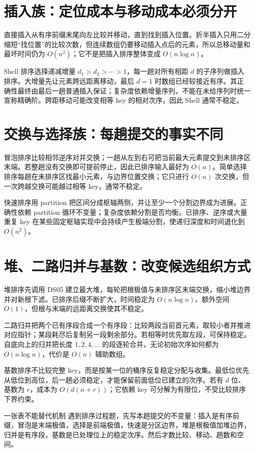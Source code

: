 \documentclass[UTF8,fontset=none,11pt,a4paper]{ctexart}
\begin{document}
\section{插入族：定位成本与移动成本必须分开}
直接插入从有序前缀末尾向左比较并移动，直到找到插入位置。折半插入只用二分缩短“找位置”的比较次数，但连续数组仍要移动插入点后的元素，所以总移动量和最坏时间仍为 $O(n^2)$；它不是把插入排序整体变成 $O(n\log n)$。

Shell 排序选择递减增量 $d_1>d_2>\cdots>1$，每一趟对所有相距 $d$ 的子序列做插入排序。大增量先让元素跨远距离移动，最后 $d=1$ 时数组已经较接近有序。其正确性最终由最后一趟普通插入保证；复杂度依赖增量序列，不能在未给序列时统一宣称精确阶。跨距移动可能改变相等 key 的相对次序，因此 Shell 通常不稳定。

\section{交换与选择族：每趟提交的事实不同}
冒泡排序比较相邻逆序对并交换；一趟从左到右可把当前最大元素提交到未排序区末端。若整趟没有交换即可提前停止，因此已排序输入最好为 $O(n)$。简单选择排序每趟在未排序区找最小元素，与边界位置交换；它只进行 $O(n)$ 次交换，但一次跨越交换可能越过相等 key，通常不稳定。

快速排序用 partition 把区间分成枢轴两侧，并让至少一个分割边界成为进展。正确性依赖 partition 循环不变量；复杂度依赖分割是否均衡。已排序、逆序或大量重复 key 在某些固定枢轴实现中会持续产生极端分割，使递归深度和时间退化到 $O(n^2)$。

\section{堆、二路归并与基数：改变候选组织方式}
堆排序先调用 DS05 建立最大堆，每轮把根极值与未排序区末端交换，缩小堆边界并对新根下滤。已排序后缀不断扩大，时间稳定为 $O(n\log n)$、额外空间 $O(1)$，但根与末端的远距离交换使其不稳定。

二路归并把两个已有序段合成一个有序段：比较两段当前首元素，取较小者并推进对应指针；某段耗尽后复制另一段剩余部分。若相等时优先取左段，可保持稳定。自底向上的归并把长度 $1,2,4,\ldots$ 的段逐轮合并，无论初始次序如何都为 $O(n\log n)$，代价是 $O(n)$ 辅助数组。

基数排序不比较完整 key，而是按某一位的桶序反复稳定分配与收集。最低位优先从低位到高位，后一趟必须稳定，才能保留前面低位已建立的次序。若有 $d$ 位、基数为 $r$，成本为 $O(d(n+r))$；它依赖 key 可分解为有限位，不受比较排序下界约束。

\begin{methodbox}{一张表不能替代机制}
遇到排序过程题，先写本趟提交的不变量：插入是有序前缀，冒泡是末端极值，选择是前端极值，快速是分区边界，堆是根极值加堆边界，归并是有序段，基数是已处理位上的稳定次序。然后才数比较、移动、趟数和空间。
\end{methodbox}
\end{document}
